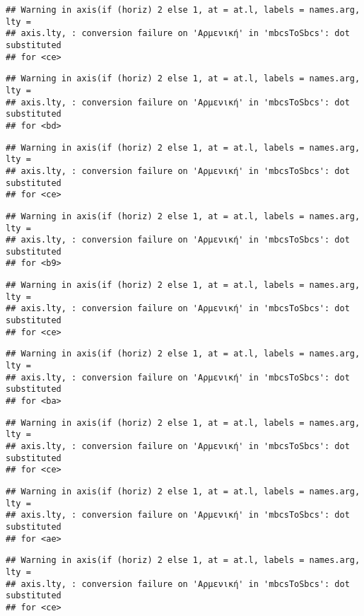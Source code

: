 \documentclass[
]{article}
\begin{document}
\begin{verbatim}
## Warning in axis(if (horiz) 2 else 1, at = at.l, labels = names.arg, lty =
## axis.lty, : conversion failure on 'Αρμενική' in 'mbcsToSbcs': dot substituted
## for <ce>
\end{verbatim}

\begin{verbatim}
## Warning in axis(if (horiz) 2 else 1, at = at.l, labels = names.arg, lty =
## axis.lty, : conversion failure on 'Αρμενική' in 'mbcsToSbcs': dot substituted
## for <bd>
\end{verbatim}

\begin{verbatim}
## Warning in axis(if (horiz) 2 else 1, at = at.l, labels = names.arg, lty =
## axis.lty, : conversion failure on 'Αρμενική' in 'mbcsToSbcs': dot substituted
## for <ce>
\end{verbatim}

\begin{verbatim}
## Warning in axis(if (horiz) 2 else 1, at = at.l, labels = names.arg, lty =
## axis.lty, : conversion failure on 'Αρμενική' in 'mbcsToSbcs': dot substituted
## for <b9>
\end{verbatim}

\begin{verbatim}
## Warning in axis(if (horiz) 2 else 1, at = at.l, labels = names.arg, lty =
## axis.lty, : conversion failure on 'Αρμενική' in 'mbcsToSbcs': dot substituted
## for <ce>
\end{verbatim}

\begin{verbatim}
## Warning in axis(if (horiz) 2 else 1, at = at.l, labels = names.arg, lty =
## axis.lty, : conversion failure on 'Αρμενική' in 'mbcsToSbcs': dot substituted
## for <ba>
\end{verbatim}

\begin{verbatim}
## Warning in axis(if (horiz) 2 else 1, at = at.l, labels = names.arg, lty =
## axis.lty, : conversion failure on 'Αρμενική' in 'mbcsToSbcs': dot substituted
## for <ce>
\end{verbatim}

\begin{verbatim}
## Warning in axis(if (horiz) 2 else 1, at = at.l, labels = names.arg, lty =
## axis.lty, : conversion failure on 'Αρμενική' in 'mbcsToSbcs': dot substituted
## for <ae>
\end{verbatim}

\begin{verbatim}
## Warning in axis(if (horiz) 2 else 1, at = at.l, labels = names.arg, lty =
## axis.lty, : conversion failure on 'Αρμενική' in 'mbcsToSbcs': dot substituted
## for <ce>
\end{verbatim}
\end{document}
